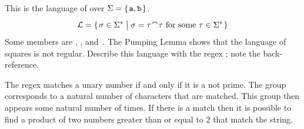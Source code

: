 \documentclass[9pt,t,serif,professionalfont,xcolor={table,dvipsnames},noamsthm]{beamer}
\begin{document}
\begin{frame}
\begin{example} \label{ex:LangSquares}
This is the language of  over $\Sigma=\set{\str{a},\str{b}}$.
\begin{equation*}
  \lang=
  \set{\sigma\in\kleenestar{\Sigma}
         \suchthat \text{$\sigma=\tau\concat\tau$ for some $\tau\in\kleenestar{\Sigma}$}}
\end{equation*}
Some members are , , and~.
The Pumping Lemma shows that the language of squares is not regular.
Describe this language with the regex ; note
the back-reference. 
\end{example}

\begin{example}
The regex  
matches a unary  number if and only if it is a
not prime.
The group corresponds to a natural number of characters that are matched. 
This group then appears some natural number of times. 
If there is a match then it is possible to find a product of two numbers 
greater than or equal to 2 that match the string.
\end{example}
\end{frame}
\end{document}
